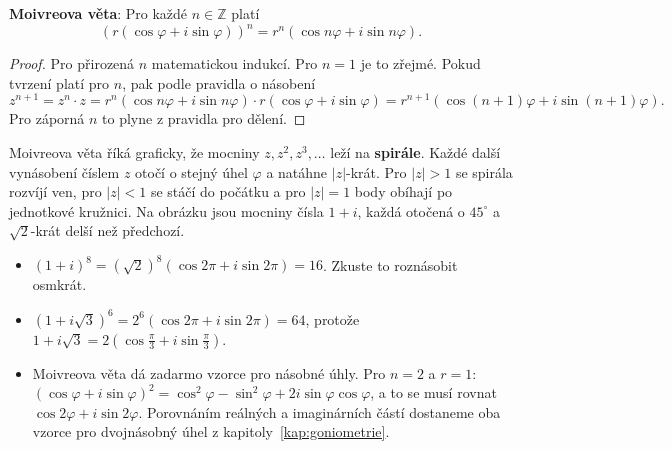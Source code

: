 \begin{definitionbox}\label{def:moivre}
  \textbf{Moivreova věta}: Pro každé $n\in\mathbb{Z}$ platí
  \begin{equation*}
    {\left(r(\cos\varphi + i\sin\varphi)\right)}^n = r^n(\cos n\varphi + i\sin n\varphi).
  \end{equation*}
\end{definitionbox}

\begin{proof}
  Pro přirozená $n$ matematickou indukcí. Pro $n = 1$ je to zřejmé. Pokud tvrzení platí pro $n$, pak podle pravidla o násobení
  \begin{equation*}
    z^{n+1} = z^n\cdot z = r^n(\cos n\varphi + i\sin n\varphi)\cdot r(\cos\varphi + i\sin\varphi) = r^{n+1}\left(\cos(n + 1)\varphi + i\sin(n + 1)\varphi\right).
  \end{equation*}
  Pro záporná $n$ to plyne z pravidla pro dělení.
\end{proof}

Moivreova věta říká graficky, že mocniny $z, z^2, z^3, \ldots$ leží na \textbf{spirále}. Každé další vynásobení číslem $z$ otočí o stejný úhel $\varphi$ a natáhne $|z|$-krát. Pro $|z| > 1$ se spirála rozvíjí ven, pro $|z| < 1$ se stáčí do počátku a pro $|z| = 1$ body obíhají po jednotkové kružnici. Na obrázku jsou mocniny čísla $1 + i$, každá otočená o $45^\circ$ a $\sqrt{2}$-krát delší než předchozí.

\begin{center}
\end{center}

\begin{example}
  \begin{itemize}
    \item ${(1 + i)}^8 = {\left(\sqrt{2}\right)}^8\left(\cos 2\pi + i\sin 2\pi\right) = 16$. Zkuste to roznásobit osmkrát.
    \item ${(1 + i\sqrt{3})}^6 = 2^6(\cos 2\pi + i\sin 2\pi) = 64$, protože $1 + i\sqrt{3} = 2\left(\cos\frac{\pi}{3} + i\sin\frac{\pi}{3}\right)$.
    \item Moivreova věta dá zadarmo vzorce pro násobné úhly. Pro $n = 2$ a $r = 1$: ${(\cos\varphi + i\sin\varphi)}^2 = \cos^2\varphi - \sin^2\varphi + 2i\sin\varphi\cos\varphi$, a to se musí rovnat $\cos 2\varphi + i\sin 2\varphi$. Porovnáním reálných a imaginárních částí dostaneme oba vzorce pro dvojnásobný úhel z kapitoly~\ref{kap:goniometrie}.
  \end{itemize}
\end{example}

